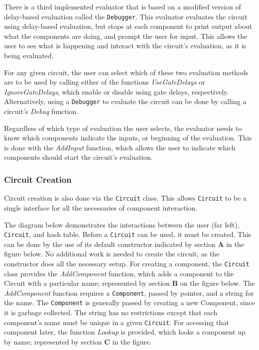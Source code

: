 \documentclass{article}
\newcommand{\Bold}[1]{\textbf{#1}}
\newcommand{\ClassName}[1]{\texttt{#1}}
\newcommand{\FunctionName}[1]{\textit{#1}}
\begin{document}
There is a third implemented evaluator that is based on a modified version of delay-based evaluation called the \ClassName{Debugger}. This evaluator evaluates the circuit using delay-based evaluation, but stops at each component to print output about what the components are doing, and prompt the user for input. This allows the user to see what is happening and interact with the circuit’s evaluation, as it is being evaluated.

For any given circuit, the user can select which of these two evaluation methods are to be used by calling either of the functions \FunctionName{UseGateDelays} or \FunctionName{IgnoreGateDelays}, which enable or disable using gate delays, respectively. Alternatively, using a \ClassName{Debugger} to evaluate the circuit can be done by calling a circuit’s \FunctionName{Debug} function.

Regardless of which type of evaluation the user selects, the evaluator needs to know which components indicate the inputs, or beginning of the evaluation. This is done with the \FunctionName{AddInput} function, which allows the user to indicate which components should start the circuit’s evaluation.

\subsubsection{Circuit Creation}

Circuit creation is also done via the \ClassName{Circuit} class. This allows \ClassName{Circuit} to be a single interface for all the necessaries of component interaction.

The diagram below demonstrates the interactions between the user (far left), \ClassName{Circuit}, and hash table. Before a \ClassName{Circuit} can be used, it must be created. This can be done by the use of its default constructor indicated by section \Bold{A} in the figure below. No additional work is needed to create the circuit, as the constructor does all the necessary setup. For creating a component, the \ClassName{Circuit} class provides the \FunctionName{AddComponent} function, which adds a component to the Circuit with a particular name; represented by section \Bold{B} on the figure below. The \FunctionName{AddComponent} function requires a \ClassName{Component}, passed by pointer, and a string for the name. The \ClassName{Component} is generally passed by creating a new Component, since it is garbage collected. The string has no restrictions except that each component’s name must be unique in a given \ClassName{Circuit}. For accessing that component later, the function \FunctionName{Lookup} is
provided, which looks a component up by name; represented by section \Bold{C} in the figure.
\end{document}

